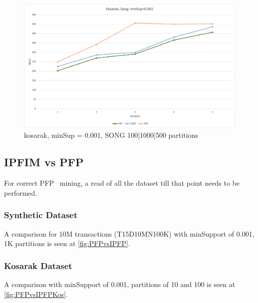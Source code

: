 \begin{figure}
  \centering
  \includegraphics[width=\linewidth]{figures/4iterations/kosarak_song_001}
  \caption{kosarak, minSup = 0.001, SONG 100|1000|500 partitions}
  \label{fig:kosarak_song_001}
\end{figure}

%


\subsection{IPFIM vs PFP}
 For correct PFP~\cite{li2008pfp} mining, a read of all the dataset till that point needs to be performed.
\subsubsection{Synthetic Dataset}
A comparison for 10M transactions (T15D10MN100K) with minSupport of 0.001, 1K partitions is seen at \autoref{fig:PFPvsIPFP}.

\subsubsection{Kosarak Dataset}
A comparison with minSupport of 0.001, partitions of 10 and 100 is seen at \autoref{fig:PFPvsIPFPKos}.


%

